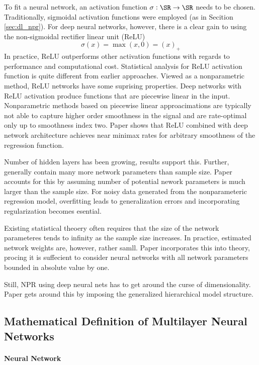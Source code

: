 To fit a neural network, an activation function $\sigma: \SR\to\SR$ needs to be chosen. Traditionally, sigmoidal activation functions were employed (as in Secition \ref{sec:dl_npr}). For deep neural networks, however, there is a clear gain to using the non-sigmoidal rectifier linear unit (ReLU) 
\[\sigma(x) = \max(x,0) = (x)_+\]
In practice, ReLU outperforms other activation functions with regards to performance and computational cost. Statistical analysis for ReLU activation function is quite different from earlier approaches. Viewed as a nonparametric method, ReLU networks have some suprising properties. Deep networks with ReLU activation produce functions that are piecewise linear in the input. Nonparametric methods based on piecewise linear approacimations are typically not able to capture higher  order smoothness in the signal and are rate-optimal only up to smoothness index two. Paper shows that ReLU combined with deep network architecture achieves near minimax rates for arbitrary smoothness of the regression function. 

Number of hidden layers has been growing, results support this. Further, generally contain many more network parameters than sample size. Paper accounts for this by assuming number of potential nework parameters is much larger than the sample size. For noisy data generated from the nonparameteric regression model, overfitting leads to generalization errors and incorporating regularization becomes esential.

Existing statistical theoery often requires that the size of the network parameteres tends to infinity as the sample size increases. In practice, estimated network weights are, however, rather samll. Paper incorporates this into theory, procing it is suffecient to consider neural networks with all network parameters bounded in absolute value by one. 

Still, NPR using deep neural nets has to get around the curse of dimensionality. Paper gets around this by imposing the generalized hierarchical model structure. 

\subsection{Mathematical Definition of Multilayer Neural Networks} 

\paragraph{Neural Network}

